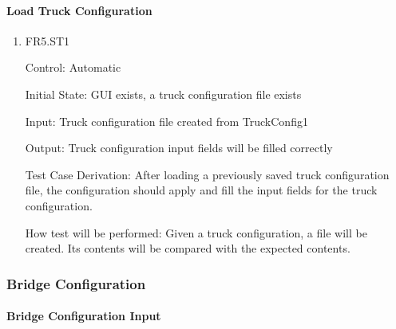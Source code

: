\documentclass[12pt, titlepage]{article}
\begin{document}
\paragraph{Load Truck Configuration}

\begin{enumerate}

  \item{FR5.ST1\\}

  Control: Automatic

  Initial State: GUI exists, a truck configuration file exists

  Input: Truck configuration file created from TruckConfig1

  Output: Truck configuration input fields will be filled correctly

  Test Case Derivation: After loading a previously saved truck configuration file, the configuration
  should apply and fill the input fields for the truck configuration.

  How test will be performed: Given a truck configuration, a file will be created. Its contents
  will be compared with the expected contents.

\end{enumerate}

\subsubsection{Bridge Configuration}

\paragraph{Bridge Configuration Input}
\end{document}
